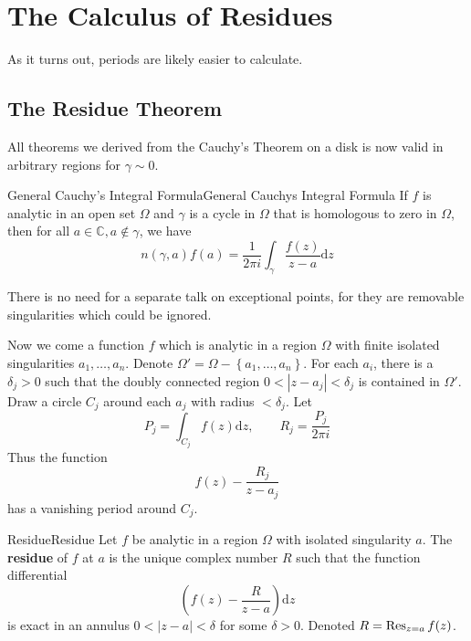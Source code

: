 \documentclass[../main.tex]{subfiles}
\begin{document}
\section{The Calculus of Residues}
As it turns out, periods are likely easier to calculate.

\subsection{The Residue Theorem}
All theorems we derived from the Cauchy's Theorem on a disk is now valid in arbitrary regions for $\gamma\sim 0$.

\begin{theorem}{General Cauchy's Integral Formula}{General Cauchys Integral Formula}
	If $f$ is analytic in an open set $\Omega$ and $\gamma$ is a cycle in $\Omega$ that is homologous to zero in $\Omega$, then for all $a\in \mathbb{C},a\notin \gamma$, we have
	\begin{equation}
		n(\gamma,a)f(a) = \frac{1}{2 \pi i} \int_{\gamma} \frac{f(z)}{z-a} \mathrm{d} z
	\end{equation}
\end{theorem}
\begin{remark}
	There is no need for a separate talk on exceptional points, for they are removable singularities which could be ignored.
\end{remark}

Now we come a function $f$ which is analytic in a region $\Omega$ with finite isolated singularities $a_1, \ldots ,a_n$. Denote $\Omega'=\Omega-\left\{ a_1, \ldots ,a_n \right\}$. For each $a_i$, there is a $\delta_j>0$ such that the doubly connected region $0<\left|z-a_j\right|<\delta_j$ is contained in $\Omega'$. Draw a circle $C_j$ around each $a_j$ with radius $<\delta_j$. Let
\begin{equation*}
	P_j = \int_{C_j} f(z) \mathrm{d} z, \qquad R_j = \frac{P_j}{2 \pi i}
\end{equation*}
Thus the function
\begin{equation*}
	f(z) - \frac{R_j}{z-a_j}
\end{equation*}
has a vanishing period around $C_j$.

\begin{definition}{Residue}{Residue}
	Let $f$ be analytic in a region $\Omega$ with isolated singularity $a$. The \textbf{residue} of $f$ at $a$ is the unique complex number $R$ such that the function differential
	\begin{equation*}
		\left(f(z) - \frac{R}{z-a} \right) \mathrm{d} z
	\end{equation*}
	is exact in an annulus $0<\left|z-a\right|<\delta$ for some $\delta>0$. Denoted $R = \operatorname{Res}_{z=a}f(z)$.
\end{definition}
\end{document}
